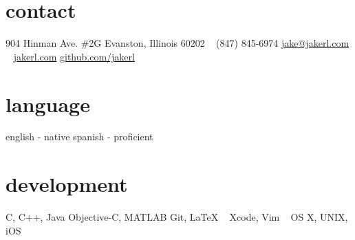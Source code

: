 \documentclass[print]{resume}
\begin{document}

\begin{aside}
\section{contact}
904 Hinman Ave. \#2G
Evanston, Illinois 60202
~
(847) 845-6974
\href{mailto:jake@jakerl.com}{jake@jakerl.com}
~
\href{http://www.jakerl.com}{jakerl.com}
\href{https://github.com/jakerl}{github.com/jakerl}
\section{language}
english - native
spanish - proficient
\section{development}
C, C++, Java
Objective-C, MATLAB
Git, \LaTeX
~
Xcode, Vim
~
OS X, UNIX, iOS

\end{aside}
\end{document}
